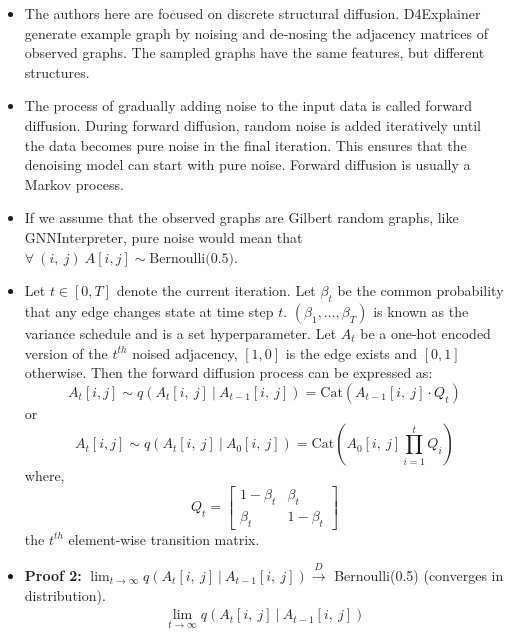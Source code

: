 \documentclass[
  11pt,
  letterpaper,
]{article}
\begin{document}
\begin{itemize}
  \begin{itemize}
  \item
    The authors here are focused on discrete structural diffusion.
    D4Explainer generate example graph by noising and de-nosing the
    adjacency matrices of observed graphs. The sampled graphs have the
    same features, but different structures.
  \item
    The process of gradually adding noise to the input data is called
    forward diffusion. During forward diffusion, random noise is added
    iteratively until the data becomes pure noise in the final
    iteration. This ensures that the denoising model can start with pure
    noise. Forward diffusion is usually a Markov process.
  \item
    If we assume that the observed graphs are Gilbert random graphs,
    like GNNInterpreter, pure noise would mean that
    \(\forall \ (i, \ j) \ A[i, j] \sim \text{Bernoulli(0.5)}\).
  \item
    Let \(t \in [0, T]\) denote the current iteration. Let \(\beta_t\)
    be the common probability that any edge changes state at time step
    \(t\). \((\beta_1, \dots, \beta_T)\) is known as the variance
    schedule and is a set hyperparameter. Let \(A_t\) be a one-hot
    encoded version of the \(t^{th}\) noised adjacency, \([1, 0]\) is
    the edge exists and \([0, 1]\) otherwise. Then the forward diffusion
    process can be expressed as:\\
    \begin{equation}
       A_t[i, j] \sim q(A_t[i, \ j] \ | \ A_{t-1}[i, \ j]) 
          = \text{Cat}(A_{t-1}[i, \ j] \cdot Q_t)
      \end{equation} or \begin{equation}
       A_t[i, j] \sim q(A_t[i, \ j] \ | \ A_{0}[i, \ j]) 
          = \text{Cat}\left(A_0[i, \ j] \prod_{i=1}^t  Q_i \right)
      \end{equation} where, \[
      Q_t = 
      \left[
      \begin{matrix}
      1-\beta_t & \beta_t \\ 
      \beta_t & 1 - \beta_t
      \end{matrix}
      \right]
      \] the \(t^{th}\) element-wise transition matrix.
  \item
    \textbf{Proof 2:}
    \(\lim_{t \to \infty} q(A_t[i, \ j] \ | \ A_{t-1}[i, \ j])  \overset{D}{\to}\)
    Bernoulli(0.5) (converges in distribution). \begin{align*}
       \lim_{t \to \infty} q(A_t[i, \ j] \ | \ A_{t-1}[i, \ j]) 

\end{align*}
\end{itemize}
\end{itemize}
\end{document}
